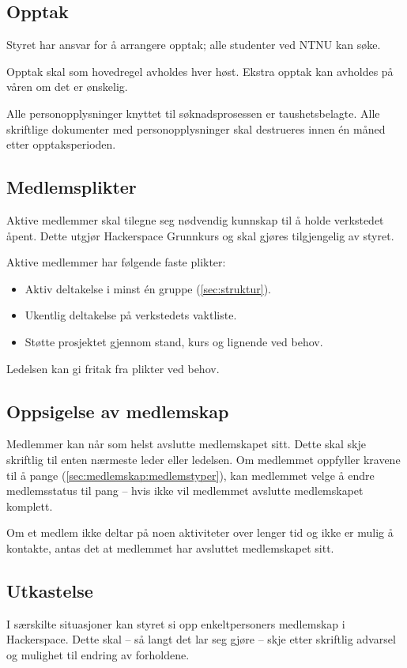 \subsection{Opptak}\label{sec:medlemskap:opptak}
Styret har ansvar for å arrangere opptak; alle studenter ved NTNU kan søke.

Opptak skal som hovedregel avholdes hver høst. Ekstra opptak kan avholdes på våren om det er ønskelig.

Alle personopplysninger knyttet til søknadsprosessen er taushetsbelagte. Alle skriftlige dokumenter med personopplysninger skal destrueres innen én måned etter opptaksperioden.

\subsection{Medlemsplikter}\label{sec:medlemskap:medlemsplikter}
Aktive medlemmer skal tilegne seg nødvendig kunnskap til å holde verkstedet åpent.
Dette utgjør Hackerspace Grunnkurs og skal gjøres tilgjengelig av styret.

Aktive medlemmer har følgende faste plikter:
\begin{itemize}
\item Aktiv deltakelse i minst én gruppe (\ref{sec:struktur}).
\item Ukentlig deltakelse på verkstedets vaktliste.
\item Støtte prosjektet gjennom stand, kurs og lignende ved behov.
\end{itemize}
Ledelsen kan gi fritak fra plikter ved behov.

\subsection{Oppsigelse av medlemskap}\label{sec:medlemskap:oppsigelse}
Medlemmer kan når som helst avslutte medlemskapet sitt.
Dette skal skje skriftlig til enten nærmeste leder eller ledelsen.
Om medlemmet oppfyller kravene til å pange (\ref{sec:medlemskap:medlemstyper}), kan medlemmet velge å endre medlemsstatus til pang -- hvis ikke vil medlemmet avslutte medlemskapet komplett.

Om et medlem ikke deltar på noen aktiviteter over lenger tid og ikke er mulig å kontakte, antas det at medlemmet har avsluttet medlemskapet sitt.

\subsection{Utkastelse}\label{sec:medlemskap:utkastelse}
I særskilte situasjoner kan styret si opp enkeltpersoners medlemskap i Hackerspace.
Dette skal -- så langt det lar seg gjøre -- skje etter skriftlig advarsel og mulighet til endring av forholdene.

